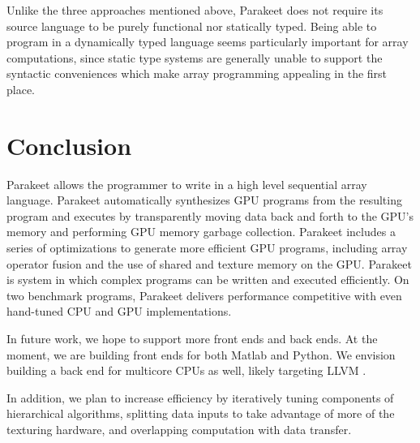 \documentclass[preprint]{sigplanconf}
\begin{document}
Unlike the three approaches mentioned above, Parakeet does not require its
source language to be purely functional nor statically typed. Being able to
program in a dynamically typed language seems particularly important for array
computations, since static type systems are generally unable to support the
syntactic conveniences which make array programming appealing in the first
place.

\section{Conclusion}
\label{Conclusion}

Parakeet allows the programmer
to write in a high level sequential array language.
Parakeet automatically synthesizes GPU programs from the resulting 
program and executes by
transparently moving data back and
forth to the GPU's memory and performing GPU memory garbage collection.
Parakeet includes a series of optimizations to generate more efficient GPU
programs, including array operator fusion and the use of shared and texture
memory on the GPU.  Parakeet is system in which complex programs can
be written and executed efficiently.  On two benchmark programs, Parakeet
delivers performance competitive with even hand-tuned CPU and GPU
implementations.

In future work, we hope to support more front ends and back ends.  At the
moment, we are building front ends for both Matlab and Python.  We envision
building a back end for multicore CPUs as well, likely targeting LLVM
\cite{Latt02}.

In addition, we plan to increase efficiency by
iteratively tuning components of hierarchical algorithms, splitting
data inputs to take advantage of more of the texturing hardware, and overlapping
computation with data transfer.  


{}
\end{document}
